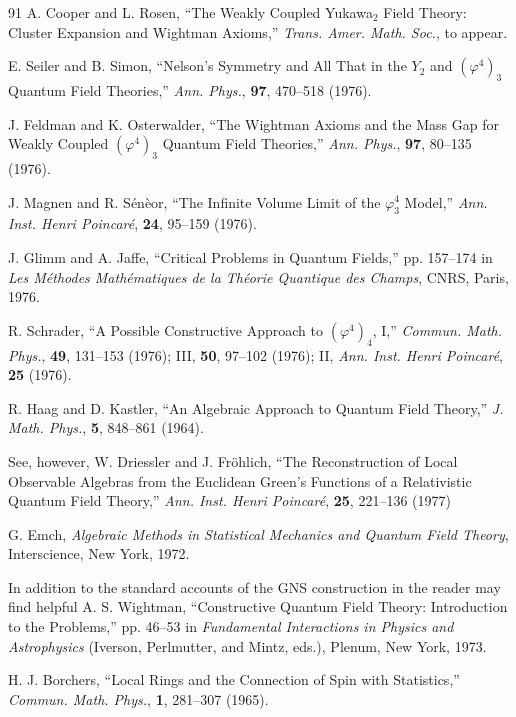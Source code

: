 \begin{thebibliography}{91}
A. Cooper and L. Rosen, ``The Weakly Coupled Yukawa$_2$ Field Theory: Cluster
Expansion and Wightman Axioms,'' \emph{Trans. Amer. Math. Soc.}, to appear.

E. Seiler and B. Simon, ``Nelson's Symmetry and All That in the $Y_2$ and
$(\varphi^4)_3$ Quantum Field Theories,'' \emph{Ann. Phys.}, \textbf{97},
470--518 (1976).

J. Feldman and K. Osterwalder, ``The Wightman Axioms and the Mass Gap for
Weakly Coupled $(\varphi^4)_3$ Quantum Field Theories,'' \emph{Ann. Phys.},
\textbf{97}, 80--135 (1976).

J. Magnen and R. S\'en\`eor, ``The Infinite Volume Limit of the $\varphi_3^4$
Model,'' \emph{Ann. Inst. Henri Poincar\'e}, \textbf{24}, 95--159 (1976).

J. Glimm and A. Jaffe, ``Critical Problems in Quantum Fields,'' pp. 157--174
in \emph{Les M\'ethodes Math\'ematiques de la Th\'eorie Quantique des Champs},
CNRS, Paris, 1976.

R. Schrader, ``A Possible Constructive Approach to $(\varphi^4)_4$, I,''
\emph{Commun. Math. Phys.}, \textbf{49}, 131--153 (1976); III, \textbf{50},
97--102 (1976); II, \emph{Ann. Inst. Henri Poincar\'e}, \textbf{25} (1976).

R. Haag and D. Kastler, ``An Algebraic Approach to Quantum Field Theory,''
\emph{J. Math. Phys.}, \textbf{5}, 848--861 (1964).

See, however, W. Driessler and J. Fr\"ohlich, ``The Reconstruction of Local
Observable Algebras from the Euclidean Green's Functions of a Relativistic
Quantum Field Theory,'' \emph{Ann. Inst. Henri Poincar\'e}, \textbf{25},
221--136 (1977)

G. Emch, \emph{Algebraic Methods in Statistical Mechanics and Quantum Field
Theory}, Interscience, New York, 1972.

In addition to the standard accounts of the GNS construction in \cite{pct-app-47,pct-app-48} the
reader may find helpful A. S. Wightman, ``Constructive Quantum Field Theory:
Introduction to the Problems,'' pp. 46--53 in \emph{Fundamental Interactions
in Physics and Astrophysics} (Iverson, Perlmutter, and Mintz, eds.), Plenum,
New York, 1973.

H. J. Borchers, ``Local Rings and the Connection of Spin with Statistics,''
\emph{Commun. Math. Phys.}, \textbf{1}, 281--307 (1965).


\end{thebibliography}
